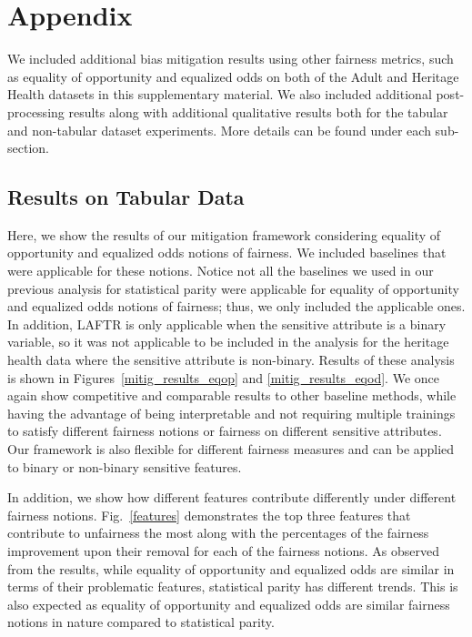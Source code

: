 \clearpage
\appendix
\section{Appendix}
We included additional bias mitigation results using other fairness metrics, such as equality of opportunity and equalized odds on both of the Adult and Heritage Health datasets in this supplementary material. We also included additional post-processing results along with additional qualitative results both for the tabular and non-tabular dataset experiments. More details can be found under each sub-section.
\subsection{Results on Tabular Data}
Here, we show the results of our mitigation framework considering equality of opportunity and equalized odds notions of fairness. We included baselines that were applicable for these notions. Notice not all the baselines we used in our previous analysis for statistical parity were applicable for equality of opportunity and equalized odds notions of fairness; thus, we only included the applicable ones. In addition, LAFTR is only applicable when the sensitive attribute is a binary variable, so it was not applicable to be included in the analysis for the heritage health data where the sensitive attribute is non-binary. Results of these analysis is shown in Figures~\ref{mitig_results_eqop} and \ref{mitig_results_eqod}. We once again show competitive and comparable results to other baseline methods, while having the advantage of being interpretable and not requiring multiple trainings to satisfy different fairness notions or fairness on different sensitive attributes. Our framework is also flexible for different fairness measures and can be applied to binary or non-binary sensitive features.


In addition, we show how different features contribute differently under different fairness notions. Fig.~\ref{features} demonstrates the top three features that contribute to unfairness the most along with the percentages of the fairness improvement upon their removal for each of the fairness notions. As observed from the results, while equality of opportunity and equalized odds are similar in terms of their problematic features, statistical parity has different trends. This is also expected as equality of opportunity and equalized odds are similar fairness notions in nature compared to statistical parity.

